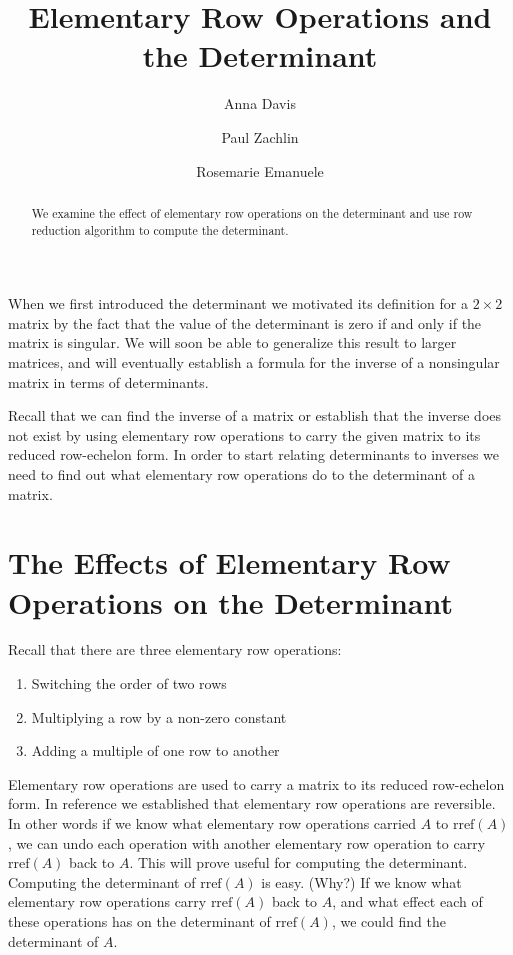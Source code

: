 \documentclass{ximera}
\author{Anna Davis \and Paul Zachlin \and Rosemarie Emanuele} \title{Elementary Row Operations and the Determinant} \license{CC-BY 4.0}
\begin{document}
\begin{abstract}
 We examine the effect of elementary row operations on the determinant and use row reduction algorithm to compute the determinant.
\end{abstract}
\maketitle

When we first introduced the determinant we motivated its definition for a $2\times 2$ matrix by the fact that the value of the determinant is zero if and only if the matrix is singular.  We will soon be able to generalize this result to larger matrices, and will eventually establish a formula for the inverse of a nonsingular matrix in terms of determinants.  

Recall that we can find the inverse of a matrix or establish that the inverse does not exist by using elementary row operations to carry the given matrix to its reduced row-echelon form.  In order to start relating determinants to inverses we need to find out what elementary row operations do to the determinant of a matrix.  

\section*{The Effects of Elementary Row Operations on the Determinant}
Recall that there are three elementary row operations:
\begin{enumerate}
\item Switching the order of two rows
\item Multiplying a row by a non-zero constant
\item Adding a multiple of one row to another
\end{enumerate}

Elementary row operations are used to carry a matrix to its reduced row-echelon form.  In {\color{red} reference} we established that elementary row operations are reversible.  In other words if we know what elementary row operations   carried $A$ to $\text{rref}(A)$, we can undo each operation with another elementary row operation to carry $\text{rref}(A)$ back to $A$.  This will prove useful for computing the determinant.  Computing the determinant of $\text{rref}(A)$ is easy. (Why?)  If we know what elementary row operations carry $\text{rref}(A)$ back to $A$, and what effect each of these operations has on the determinant of $\text{rref}(A)$, we could find the determinant of $A$.  
\end{document}
